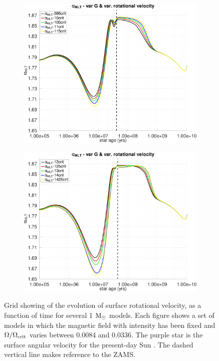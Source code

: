 \documentclass[fleqn,usenatbib]{mnras}
\begin{document}
\begin{figure}
    \centering
    \begin{subfigure}[h]{0.47\textwidth}
    \includegraphics[clip,width=\textwidth]{figures/paper2/alpha_mlt_var_vel_g1.pdf}
    \label{fig:subim41}
    \end{subfigure}
    \begin{subfigure}[h]{0.47\textwidth}
    \includegraphics[clip,width=\textwidth]{figures/paper2/alpha_mlt_var_vel_g3.pdf}
    \label{fig:subim42}
    \end{subfigure}
\caption{Grid showing of the evolution of surface rotational velocity, as a function of time for several 1 $\mathrm{M}_\odot$ models. Each figure shows a set of models in which the magnetic field with intensity has been fixed and $\Omega / \Omega_{\mathrm{crit}}$ varies between 0.0084 and 0.0336. The purple star is the surface angular velocity for the present-day Sun \citep{Gill2012}. The dashed vertical line makes reference to the ZAMS.}
\label{fig:grid_rot_vel}
\end{figure}


\appendix



\bsp	%
\label{lastpage}
\end{document}
